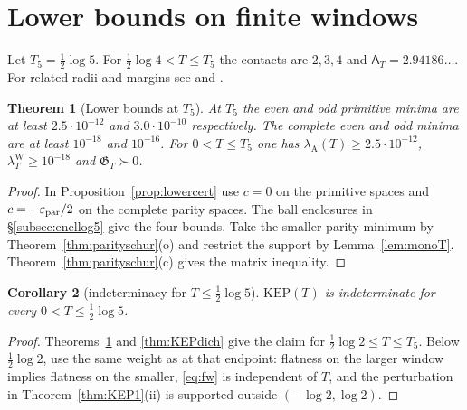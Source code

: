 \documentclass[10pt]{amsart}
\newtheorem{theorem}{Theorem}[section]
\newtheorem{corollary}[theorem]{Corollary}
\theoremstyle{definition}
\theoremstyle{remark}
\newcommand{\lamW}{\lambda^{\mathrm W}_T}
\newcommand{\lamA}{\lambda_{\mathrm A}(T)}
\newcommand{\Aconst}{\mathsf A_T}
\begin{document}
\section{Lower bounds on finite windows}\label{sec:log5}

Let $T_5=\tfrac12\log5$. For $\tfrac12\log4<T\le T_5$ the
contacts are $2,3,4$ and $\Aconst=2.94186\ldots$.
For related radii and margins see \cite[Thm.~1.2]{Zhu2026}
and \cite[Thms.~A, B]{Liu2026}.

\begin{theorem}[Lower bounds at $T_5$]\label{thm:log5W}\label{thm:log5A}
At $T_5$ the even and odd primitive minima are at least
$2.5\cdot10^{-12}$ and $3.0\cdot10^{-10}$ respectively.
The complete even and odd minima are at least $10^{-18}$ and
$10^{-16}$. For $0<T\le T_5$ one has $\lamA\ge2.5\cdot10^{-12}$,
$\lamW\ge10^{-18}$ and $\mathfrak G_T\succ0$.
\end{theorem}
\begin{proof}
In Proposition~\ref{prop:lowercert} use $c=0$ on the primitive spaces
and $c=-\varepsilon_{\rm par}/2$ on the complete parity spaces.
The ball enclosures in \S\ref{subsec:encllog5} give the four bounds.
Take the smaller parity minimum by Theorem~\ref{thm:parityschur}(o)
and restrict the support by Lemma~\ref{lem:monoT}.
Theorem~\ref{thm:parityschur}(c) gives the matrix inequality.
\end{proof}

\begin{corollary}[indeterminacy for $T\le\frac12\log5$]\label{cor:KEPlog5}
$\mathrm{KEP}(T)$ is indeterminate for every $0<T\le\frac12\log5$.
\end{corollary}
\begin{proof}
Theorems~\ref{thm:log5W} and \ref{thm:KEPdich} give the claim for
$\frac12\log2\le T\le T_5$. Below $\frac12\log2$, use the same weight as at
that endpoint: flatness on the larger window implies flatness on the smaller,
\eqref{eq:fw} is independent of $T$, and the perturbation in
Theorem~\ref{thm:KEP1}(ii) is supported outside $(-\log2,\log2)$.
\end{proof}
\end{document}
